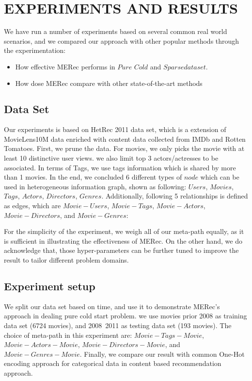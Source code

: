 \section{EXPERIMENTS AND RESULTS}\label{4_experiment}
We have run a number of experiments based on several common real world scenarios, and we compared our approach with other popular methods through the experimentation:
\begin{itemize}
    \item How effective MERec performs in $Pure$ $Cold$ and $Sparse dataset$.
    \item How dose MERec compare with other state-of-the-art methods
\end{itemize}

\subsection{Data Set}
Our experiments is based on HetRec 2011 \cite{CantadorRecSys2011} data set, which is a extension of MovieLens10M data enriched with content data collected from IMDb and Rotten Tomatoes.
First, we prune the data. For movies, we only picks the movie with at least 10 distinctive user views. we also limit top 3 actors/actresses to be associated. In terms of Tags, we use tags information which is shared by more than 1 movies. In the end, we concluded 6 different types of $node$ which can be used in heterogeneous information graph, shown as following: $Users$, $Movies$, $Tags$, $Actors$, $Directors$, $Genres$.
Additionally, following 5 relationships is defined as edges, which are $Movie-Users$, $Movie-Tags$, $Movie-Actors$, $Movie-Directors$, and $Movie-Genres$:

For the simplicity of the experiment, we weigh all of our meta-path equally, as it is sufficient in illustrating the effectiveness of MERec. On the other hand, we do acknowledge that, those hyper-parameters can be further tuned to improve the result to tailor different problem domains. 


\subsection{Experiment setup}
We split our data set based on time, and use it to demonstrate MERec's approach in dealing pure cold start problem.
we use movies prior 2008 as training data set (6724 movies), and 2008~2011 as testing data set (193 movies). 
The choice of meta-path in this experiment are: $Movie-Tags-Movie$, $Movie-Actors-Movie$, $Movie-Directors-Movie$, and $Movie-Genres-Movie$. 
Finally, we compare our result with common One-Hot encoding approach for categorical data in content based recommendation approach.

